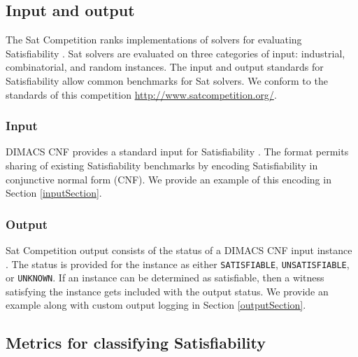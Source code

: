 	\subsection{Input and output}
	
	
 The {\sc Sat} Competition ranks implementations of solvers for evaluating {\sc Satisfiability} \cite{satcompetition}.  {\sc Sat} solvers are evaluated on three categories of input: industrial, combinatorial, and random instances.  The input and output standards for {\sc Satisfiability} allow common benchmarks for {\sc Sat} solvers.  We conform to the standards of this competition \url{http://www.satcompetition.org/}.  
 

	
		\subsubsection{Input}
		
DIMACS CNF provides a standard input for {\sc Satisfiability} \cite{dimacsFormat}.  The format permits sharing of existing {\sc Satisfiability} benchmarks by encoding {\sc Satisfiability} in conjunctive normal form (CNF).  We provide an example of this encoding in Section \ref{inputSection}.
		
		\subsubsection{Output}
		

{\sc Sat} Competition output consists of the status of a DIMACS CNF input instance \cite{satcompetition}.  The status is provided for the instance as either \texttt{SATISFIABLE}, \texttt{UNSATISFIABLE}, or \texttt{UNKNOWN}.  If an instance can be determined as satisfiable, then a witness satisfying the instance gets included with the output status.  We provide an example along with custom output logging in Section \ref{outputSection}.
	
	\subsection{Metrics for classifying {\sc Satisfiability}}

